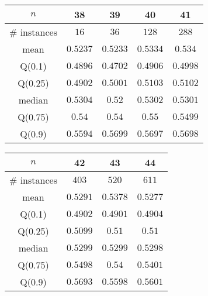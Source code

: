 \begin{tabular}{c|cccc} 
\hline 
$n$ & 38 & 39 & 40 & 41 \tabularnewline 
\hline 
\hline 
\# instances & $16$ & $36$ & $128$ & $288$ \tabularnewline 
mean & $0.5237$ & $0.5233$ & $0.5334$ & $0.534$ \tabularnewline 
Q(0.1) & $0.4896$ & $0.4702$ & $0.4906$ & $0.4998$ \tabularnewline 
Q(0.25) & $0.4902$ & $0.5001$ & $0.5103$ & $0.5102$ \tabularnewline 
median & $0.5304$ & $0.52$ & $0.5302$ & $0.5301$ \tabularnewline 
Q(0.75) & $0.54$ & $0.54$ & $0.55$ & $0.5499$ \tabularnewline 
Q(0.9) & $0.5594$ & $0.5699$ & $0.5697$ & $0.5698$ \tabularnewline 
\hline 
\end{tabular} 
\medskip{} 

\begin{tabular}{c|ccc} 
\hline 
$n$ & 42 & 43 & 44 \tabularnewline 
\hline 
\hline 
\# instances & $403$ & $520$ & $611$ \tabularnewline 
mean & $0.5291$ & $0.5378$ & $0.5277$ \tabularnewline 
Q(0.1) & $0.4902$ & $0.4901$ & $0.4904$ \tabularnewline 
Q(0.25) & $0.5099$ & $0.51$ & $0.51$ \tabularnewline 
median & $0.5299$ & $0.5299$ & $0.5298$ \tabularnewline 
Q(0.75) & $0.5498$ & $0.54$ & $0.5401$ \tabularnewline 
Q(0.9) & $0.5693$ & $0.5598$ & $0.5601$ \tabularnewline 
\hline 
\end{tabular} 
\medskip{} 

